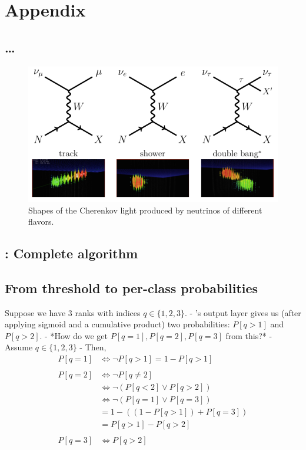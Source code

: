 \chapter{Appendix}
\blindtext

\section{…} %
\begin{figure}
  \centering
  \includegraphics[width=\textwidth]{content/img/flavors1.png}
  \caption{
    Shapes of the Cherenkov light produced by neutrinos of different flavors.
    \citationneeded{}
  }
  \label{fig:img:icecube:interactions}
\end{figure}


\section{\dseaplus{}: Complete algorithm} \label{sec:alg:dseaplus}



\section{From threshold to per-class probabilities}
\label{sec:appendix:corn_probas}
Suppose we have 3 ranks with indices $q \in \{1, 2, 3\}$.
- \corn{}'s output layer gives us (after applying sigmoid and a cumulative product) two probabilities:
	$P[q>1]$ and
	$P[q>2]$.
- *How do we get $P[q=1], P[q=2], P[q=3]$ from this?*
- Assume $q \in \{1,2,3\}$
- Then,
\begin{align*}
  P[q=1] &\iff \neg P[q>1] = 1 - P[q>1] \\
  \\
  P[q=2] &\iff \neg P[q≠2] \\
  &\iff \neg(P[q<2] \lor P[q>2]) \\
  &\iff \neg(P[q=1] \lor P[q=3]) \\
  &= 1 - ((1 - P[q>1]) + P[q=3]) \\
  &= P[q>1] - P[q>2] \\
  \\
  P[q=3] &\iff P[q>2]
\end{align*}


